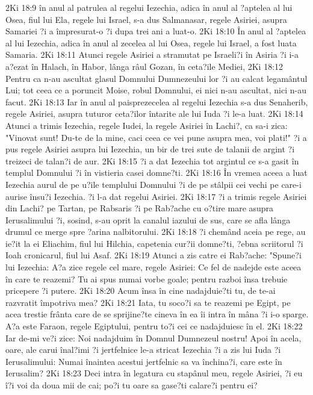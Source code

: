 2Ki 18:9  în anul al patrulea al regelui Iezechia, adica în anul al ?aptelea al lui Osea, fiul lui Ela, regele lui Israel, s-a dus Salmanasar, regele Asiriei, asupra Samariei ?i a împresurat-o ?i dupa trei ani a luat-o.
2Ki 18:10  În anul al ?aptelea al lui Iezechia, adica în anul al zecelea al lui Osea, regele lui Israel, a fost luata Samaria.
2Ki 18:11  Atunci regele Asiriei a stramutat pe Israeli?i în Asiria ?i i-a a?ezat în Halach, în Habor, lânga râul Gozan, în ceta?ile Mediei,
2Ki 18:12  Pentru ca n-au ascultat glasul Domnului Dumnezeului lor ?i au calcat legamântul Lui; tot ceea ce a poruncit Moise, robul Domnului, ei nici n-au ascultat, nici n-au facut.
2Ki 18:13  Iar în anul al paisprezecelea al regelui Iezechia s-a dus Senaherib, regele Asiriei, asupra tuturor ceta?ilor întarite ale lui Iuda ?i le-a luat.
2Ki 18:14  Atunci a trimis Iezechia, regele Iudei, la regele Asiriei în Lachi?, ca sa-i zica: "Vinovat sunt! Du-te de la mine, caci ceea ce vei pune asupra mea, voi plati!" ?i a pus regele Asiriei asupra lui Iezechia, un bir de trei sute de talanii de argint ?i treizeci de talan?i de aur.
2Ki 18:15  ?i a dat Iezechia tot argintul ce s-a gasit în templul Domnului ?i în vistieria casei domne?ti.
2Ki 18:16  În vremea aceea a luat Iezechia aurul de pe u?ile templului Domnului ?i de pe stâlpii cei vechi pe care-i aurise însu?i Iezechia. ?i l-a dat regelui Asiriei.
2Ki 18:17  ?i a trimis regele Asiriei din Lachi? pe Tartan, pe Rabsaris ?i pe Rab?ache cu o?tire mare asupra Ierusalimului ?i, sosind, s-au oprit la canalul iazului de sus, care se afla lânga drumul ce merge spre ?arina nalbitorului.
2Ki 18:18  ?i chemând aceia pe rege, au ie?it la ei Eliachim, fiul lui Hilchia, capetenia cur?ii domne?ti, ?ebna scriitorul ?i Ioah cronicarul, fiul lui Asaf.
2Ki 18:19  Atunci a zis catre ei Rab?ache: "Spune?i lui Iezechia: A?a zice regele cel mare, regele Asiriei: Ce fel de nadejde este aceea în care te reazemi? Tu ai spus numai vorbe goale; pentru razboi însa trebuie pricepere ?i putere.
2Ki 18:20  Acum însa în cine nadajduie?ti tu, de te-ai razvratit împotriva mea?
2Ki 18:21  Iata, tu soco?i sa te reazemi pe Egipt, pe acea trestie frânta care de se sprijine?te cineva în ea îi intra în mâna ?i i-o sparge. A?a este Faraon, regele Egiptului, pentru to?i cei ce nadajduiesc în el.
2Ki 18:22  Iar de-mi ve?i zice: Noi nadajduim în Domnul Dumnezeul nostru! Apoi în acela, oare, ale carui înal?imi ?i jertfelnice le-a stricat Iezechia ?i a zis lui Iuda ?i Ierusalimului: Numai înaintea acestui jertfelnic sa va închina?i, care este în Ierusalim?
2Ki 18:23  Deci intra în legatura cu stapânul meu, regele Asiriei, ?i eu î?i voi da doua mii de cai; po?i tu oare sa gase?ti calare?i pentru ei?
